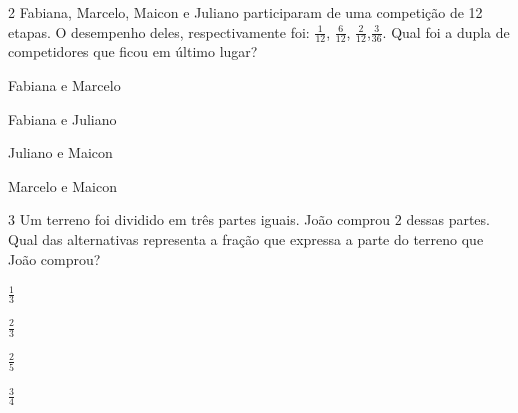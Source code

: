 

\num{2} Fabiana, Marcelo, Maicon e Juliano participaram de uma competição de
12 etapas. O desempenho deles, respectivamente foi: $\frac{1}{12}$,
$\frac{6}{12}$, $\frac{2}{12}$,$\frac{3}{36}$. Qual foi a dupla de
competidores que ficou em último lugar?

\begin{escolha}
\item
  Fabiana e Marcelo
\item
  Fabiana e Juliano
\item
  Juliano e Maicon
\item
  Marcelo e Maicon
\end{escolha}



\num{3} Um terreno foi dividido em três partes iguais. João comprou $2$ dessas
partes. Qual das alternativas representa a fração que expressa a parte
do terreno que João comprou?

\begin{escolha}
\item $\frac{1}{3}$
\item $\frac{2}{3}$
\item $\frac{2}{5}$
\item $\frac{3}{4}$
\end{escolha}

